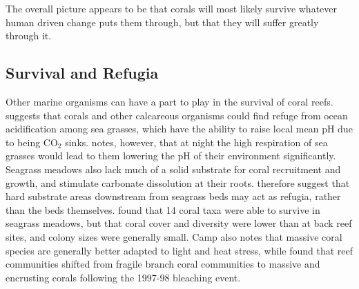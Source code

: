 \documentclass[11pt,a4paper]{article}
\begin{document}
The overall picture appears to be that corals will most likely survive whatever human driven change puts them through, but that they will suffer greatly through it.

\subsection{Survival and Refugia}


Other marine organisms can have a part to play in the survival of coral reefs. \cite{Manzello2012} suggests that corals and other calcareous organisms could find refuge from ocean acidification among sea grasses, which have the ability to raise local mean pH due to being CO$_{2}$ sinks. \cite{Camp2018} notes, however, that at night the high respiration of sea grasses would lead to them lowering the pH of their environment significantly. Seagrass meadows also lack much of a solid substrate for coral recruitment and growth, and stimulate carbonate dissolution at their roots. 
\cite{Manzello2012} therefore suggest that hard substrate areas downstream from seagrass beds may act as refugia, rather than the beds themselves. \cite{Lohr2017} found that 14 coral taxa were able to survive in seagrass meadows, but that coral cover and diversity were lower than at back reef sites, and colony sizes were generally small.
Camp also notes that massive coral species are generally better adapted to light and heat stress, while \cite{Loya2001} found that reef communities shifted from fragile branch coral communities to massive and encrusting corals following the 1997-98 bleaching event. 
\end{document}
